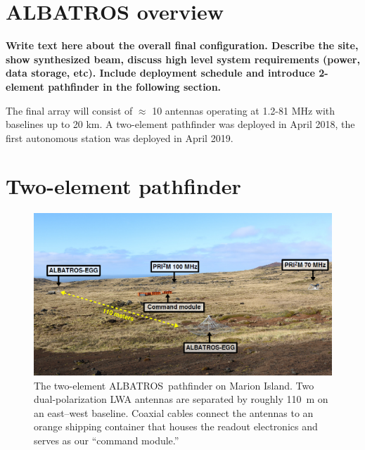 \documentclass{ws-jai}
\def\albatros{ALBATROS}
\begin{document}
\section{ALBATROS overview}

{\bf Write text here about the overall final configuration.  Describe
  the site, show synthesized beam, discuss high level system
  requirements (power, data storage, etc).  Include deployment
  schedule and introduce 2-element pathfinder in the following
  section.}

The final array will consist of $\approx$ 10 antennas operating at
1.2-81 MHz with baselines up to 20 km. A two-element pathfinder was
deployed in April 2018, the first autonomous station was deployed in
April 2019.

\section{Two-element pathfinder}

\begin{figure}
  \begin{center}
    \includegraphics[width=0.7\linewidth]{Figures/ALBATROS-EGG.PNG}
    \caption{The two-element \albatros\ pathfinder on Marion Island.
      Two dual-polarization LWA antennas are separated by roughly
      110~m on an east--west baseline. Coaxial cables connect the
      antennas to an orange shipping container that houses the readout
      electronics and serves as our ``command module.''}
    \label{Fig:albatros2}
  \end{center}
\end{figure}
\end{document}
